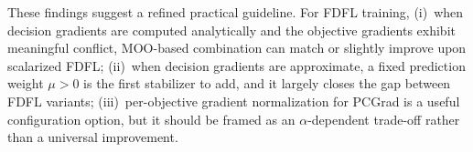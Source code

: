 These findings suggest a refined practical guideline. For FDFL training,
(i)~when decision gradients are computed analytically and the objective
gradients exhibit meaningful conflict, MOO-based combination can match
or slightly improve upon scalarized FDFL; (ii)~when decision gradients
are approximate, a fixed prediction weight $\mu > 0$ is the first
stabilizer to add, and it largely closes the gap between FDFL variants;
(iii)~per-objective gradient normalization for PCGrad is a useful
configuration option, but it should be framed as an $\alpha$-dependent
trade-off rather than a universal improvement.
